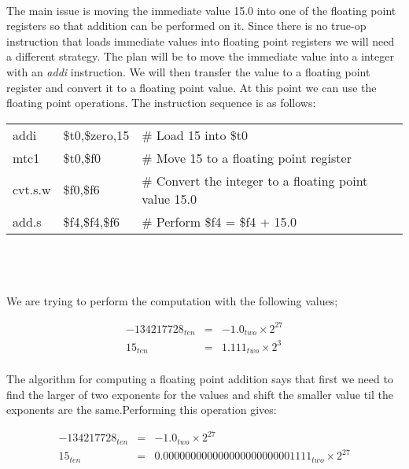 \documentclass[11pt,reqno]{article}
\begin{document}
\noindent {}\\ 

The main issue is moving the immediate value 15.0 into one of the floating point registers so that addition can be performed on it. Since there is no true-op instruction that loads immediate values into floating point registers we will need a different strategy. The plan will be to move the immediate value into a integer with an \emph{addi} instruction. We will then transfer the value to a floating point register and convert it to a floating point value. At this point we can use the floating point operations. The instruction sequence is as follows:\\

\begin{tabular}{l l l}
addi \quad &\$t0,\$zero,15 \qquad & \# Load 15 into \$t0\\
mtc1 \quad &\$t0,\$f0 & \# Move 15 to a floating point register \\
cvt.s.w \quad &\$f0,\$f6 & \# Convert the integer to a floating point value 15.0\\
add.s \quad & \$f4,\$f4,\$f6 & \# Perform \$f4 = \$f4 + 15.0 \\ 
\end{tabular} \\ \\

\noindent {}\\ 

We are trying to perform the computation with the following values;

 \begin{eqnarray*}
-134217728_{ten} &=& -1.0_{two} \times 2^{27} \\
15_{ten} &=& 1.111_{two} \times 2^3 \\
\end{eqnarray*}

The algorithm for computing a floating point addition says that first we need to find the larger of two exponents for the values and shift the smaller value til the exponents are the same.\newpage \noindent Performing this operation gives:

 \begin{eqnarray*}
-134217728_{ten} &=& -1.0_{two} \times 2^{27} \\
15_{ten} &=& 0.00000000 00000000 0000000 1111_{two} \times 2^{27} \\
\end{eqnarray*}
\end{document}
